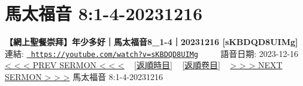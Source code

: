 \documentclass{book}
\begin{document}
\section{馬太福音 8:1-4-20231216}
\label{sec:sKBDQD8UIMg}
\textbf{【網上聖餐崇拜】年少多好｜馬太福音8\_1-4｜20231216 [sKBDQD8UIMg]}
\newline
\newline
連結: \href{https://youtube.com/watch?v=sKBDQD8UIMg}{\texttt{ https://youtube.com/watch?v=sKBDQD8UIMg}} ~~~~ 語音日期: 2023-12-16 
\newline
\newline
\hyperref[sec:0oiGMpkgXB8]{\small{< < < PREV SERMON < < <}}
~
\hyperref[sec:index_chronic]{\small{[返順時目]}}
~
\hyperref[sec:index_scriptual]{\small{[返順卷目]}}
~
\hyperref[sec:dT3dN2jF8BQ]{\small{> > > NEXT SERMON > > >}}
\newline
\newline
馬太福音 8:1-4-20231216
\newline
\end{document}
